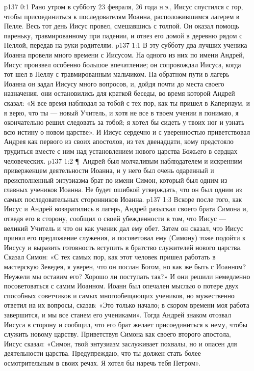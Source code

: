 \author{Комиссия срединников}
\vs p137 0:1 Рано утром в субботу 23 февраля, 26 года н.э., Иисус спустился с гор, чтобы присоединиться к последователям Иоанна, расположившимся лагерем в Пелле. Весь тот день Иисус провел, смешавшись с толпой. Он оказал помощь пареньку, травмированному при падении, и отвез его домой в деревню рядом с Пеллой, передав на руки родителям.
\vs p137 1:1 В эту субботу два лучших ученика Иоанна провели много времени с Иисусом. На одного из них по имени Андрей, Иисус произвел особенно большое впечатление; он сопровождал Иисуса, когда тот шел в Пеллу с травмированным мальчиком. На обратном пути в лагерь Иоанна он задал Иисусу много вопросов, и, дойдя почти до места своего назначения, они остановились для краткой беседы, во время которой Андрей сказал: «Я все время наблюдал за тобой с тех пор, как ты пришел в Капернаум, и я верю, что ты --- новый Учитель, и хотя не все в твоем учении я понимаю, я окончательно решил следовать за тобой; я хотел бы сидеть у твоих ног и узнать всю истину о новом царстве». И Иисус сердечно и с уверенностью приветствовал Андрея как первого из своих апостолов, из тех двенадцати, кому предстояло трудиться вместе с ним над установлением нового царства Божьего в сердцах человеческих.
\vs p137 1:2 \P\ Андрей был молчаливым наблюдателем и искренним приверженцем деятельности Иоанна, и у него был очень одаренный и преисполненный энтузиазма брат по имени Симон, который был одним из главных учеников Иоанна. Не будет ошибкой утверждать, что он был одним из самых последовательных сторонников Иоанна.
\vs p137 1:3 Вскоре после того, как Иисус и Андрей возвратились в лагерь, Андрей разыскал своего брата Симона и, отведя его в сторону, сообщил о своей убежденности в том, что Иисус --- великий Учитель и что он как ученик дал ему обет. Затем он сказал, что Иисус принял его предложение служения, и посоветовал ему (Симону) тоже подойти к Иисусу и выразить готовность вступить в братство служителей нового царства. Сказал Симон: «С тех самых пор, как этот человек пришел работать в мастерскую Зеведея, я уверен, что он послан Богом, но как же быть с Иоанном? Неужели мы оставим его? Хорошо ли поступать так?» И они решили немедленно посоветоваться с самим Иоанном. Иоанн был опечален мыслью о потере двух способных советчиков и самых многообещающих учеников, но мужественно ответил на их вопросы, сказав: «Это только начало; в скором времени моя работа завершится, и мы все станем его учениками». Тогда Андрей знаком отозвал Иисуса в сторону и сообщил, что его брат желает присоединиться к нему, чтобы служить новому царству. Приветствуя Симона как своего второго апостола, Иисус сказал: «Симон, твой энтузиазм заслуживает похвалы, но и опасен для деятельности царства. Предупреждаю, что ты должен стать более осмотрительным в своих речах. Я хотел бы наречь тебя Петром».
